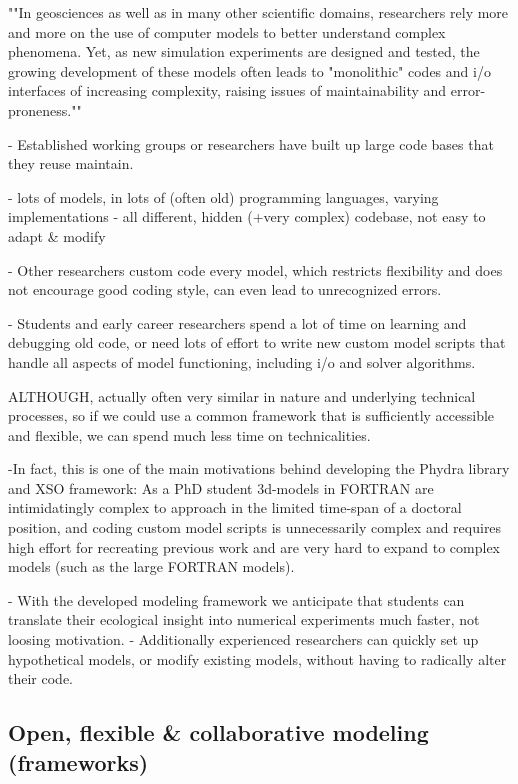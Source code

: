 \documentclass[journal abbreviation, manuscript]{copernicus}
\begin{document}
""In geosciences as well as in many other scientific domains, researchers rely more and more on the use of computer models to better understand complex phenomena. Yet, as new simulation experiments are designed and tested, the growing development of these models often leads to "monolithic" codes and i/o interfaces of increasing complexity, raising issues of maintainability and error-proneness.""

- Established working groups or researchers have built up large code bases that they reuse maintain.

- lots of models, in lots of (often old) programming languages, varying implementations
- all different, hidden (+very complex) codebase, not easy to adapt \& modify

- Other researchers custom code every model, which restricts flexibility and does not encourage good coding style, can even lead to unrecognized errors.

- Students and early career researchers spend a lot of time on learning and debugging old code, or need lots of effort to write new custom model scripts that handle all aspects of model functioning, including i/o and solver algorithms.

ALTHOUGH, actually often very similar in nature and underlying technical processes, so if we could use a common framework that is sufficiently accessible and flexible, we can spend much less time on technicalities.

-In fact, this is one of the main motivations behind developing the Phydra library and XSO framework: As a PhD student 3d-models in FORTRAN are intimidatingly complex to approach in the limited time-span of a doctoral position, and coding custom model scripts is unnecessarily complex and requires high effort for recreating previous work and are very hard to expand to complex models (such as the large FORTRAN models).

- With the developed modeling framework we anticipate that students can translate their ecological insight into numerical experiments much faster, not loosing motivation.
- Additionally experienced researchers can quickly set up hypothetical models, or modify existing models, without having to radically alter their code.




\subsection{Open, flexible \& collaborative modeling (frameworks)}
\end{document}
